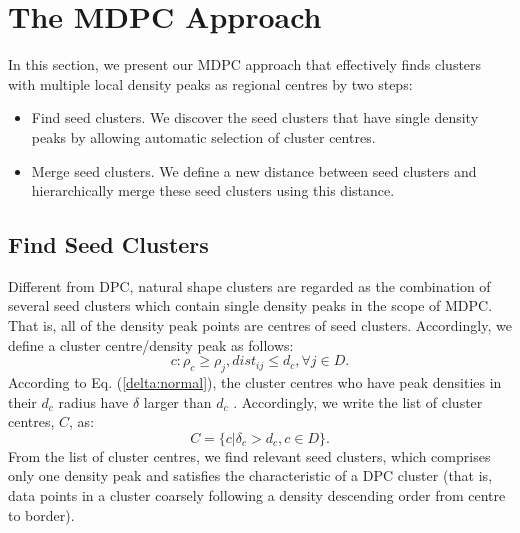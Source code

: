 \documentclass{llncs}
\begin{document}
\section{The MDPC Approach}
In this section, we present our MDPC approach that effectively finds clusters with multiple local density peaks as regional centres by two steps: 
\begin{itemize}
\item Find seed clusters. We discover the seed clusters that have single density peaks by allowing automatic selection of cluster centres.
\item Merge seed clusters. We define a new distance between seed clusters and hierarchically merge these seed clusters using this distance.
\end{itemize}

\subsection{Find Seed Clusters}
Different from DPC, natural shape clusters are regarded as the combination of several seed clusters which contain single density peaks in the scope of MDPC. That is,
all of the density peak points are centres of seed clusters. Accordingly, we define a cluster centre/density peak as follows:
\begin{equation}
c : \rho_{c} \geq \rho_{j},  dist_{ij} \leq d_{c}, \forall j \in D.
\label{link:density}
\end{equation}
%
According to Eq. (\ref{delta:normal}), the cluster centres who have peak densities in their $d_{c}$ radius have $\delta$ larger than $d_{c}$ . Accordingly, we write the list of cluster centres, $C$, as:
%
\begin{equation}
C = \{c | \delta_{c} > d_{c}, c \in D\}.
\label{link:delta}
\end{equation}
From the list of cluster centres, we find relevant seed clusters, which comprises only one density peak and satisfies the characteristic of a DPC cluster (that is, data points in a cluster coarsely following a density descending order from centre to border).
\end{document}

